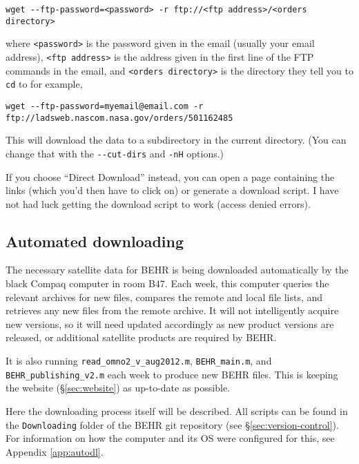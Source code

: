 \documentclass[12pt]{article}
\begin{document}
\begin{itemize}
\begin{lstlisting}[basicstyle=\scriptsize\ttfamily]
wget --ftp-password=<password> -r ftp://<ftp address>/<orders directory>
\end{lstlisting}
		
where \lstinline$<password>$ is the password given in the email (usually your email address), \lstinline$<ftp address>$ is the address given in the first line of the FTP commands in the email, and \lstinline$<orders directory>$ is the directory they tell you to \lstinline$cd$ to for example,

\begin{lstlisting}[basicstyle=\scriptsize\ttfamily]
wget --ftp-password=myemail@email.com -r ftp://ladsweb.nascom.nasa.gov/orders/501162485
\end{lstlisting}

This will download the data to a  subdirectory in the current directory. (You can change that with the \lstinline$--cut-dirs$ and \lstinline$-nH$ options.)
		
		If you choose ``Direct Download'' instead, you can open a page containing the links (which you'd then have to click on) or generate a download script. I have not had luck getting the download script to work (access denied errors).
		
	\end{itemize}


	\subsection{Automated downloading}
	
		The necessary satellite data for BEHR is being downloaded automatically by the black Compaq computer in room B47. Each week, this computer queries the relevant archives for new files, compares the remote and local file lists, and retrieves any new files from the remote archive.  It will not intelligently acquire new versions, so it will need updated accordingly as new product versions are released, or additional satellite products are required by BEHR.
		
		It is also running \lstinline$read_omno2_v_aug2012.m$, \lstinline$BEHR_main.m$, and \lstinline$BEHR_publishing_v2.m$ each week to produce new BEHR files. This is keeping the website (\S\ref{sec:website}) as up-to-date as possible.
		
		Here the downloading process itself will be described. All scripts can be found in the \texttt{Downloading} folder of the BEHR git repository (see \S\ref{sec:version-control}).  For information on how the computer and its OS were configured for this, see Appendix \ref{app:autodl}.
		
\end{document}
